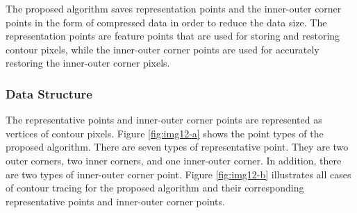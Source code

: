 
 The proposed algorithm saves representation points and the inner-outer corner points in the form of compressed data in order to reduce the data size. The representation points are feature points that are used for storing and restoring contour pixels, while the inner-outer corner points are used for accurately restoring the inner-outer corner pixels. 

 \subsubsection{Data Structure}

The representative points and inner-outer corner points are represented as vertices of contour pixels. Figure \ref{fig:img12-a} shows the point types of the proposed algorithm. There are seven types of representative point. They are two outer corners, two inner corners, and one inner-outer corner. In addition, there are two types of inner-outer corner point. Figure \ref{fig:img12-b} illustrates all cases of contour tracing for the proposed algorithm and their corresponding representative points and inner-outer corner points. 


